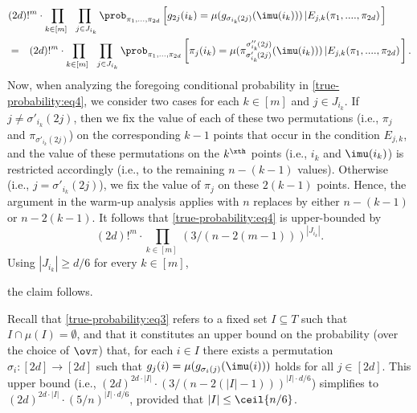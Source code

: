 %
%
%
\begin{eqnarray}
\lefteqn{(2d)!^{m}\cdot\prod_{k\in[m]~} \prod_{~j\in J_{i_k}}
     \prob_{\pi_1,\ldots,\pi_{2d}}
          \left[g_{2j}(i_k)=\mu(g_{\sigma_{i_k}\!(2j)}(\imu(i_k)))\left|
                E_{j,k}(\pi_1,....,\pi_{2d}) \right.\right]}
\nonumber \\
&=& (2d)!^{m}\cdot\prod_{k\in[m]~} \prod_{~j\in J_{i_k}}
     \prob_{\pi_1,\ldots,\pi_{2d}}
          \left[\pi_{j}(i_k)
      =\mu(\pi^{\sigma''_{i_k}\!(2j)}_{\sigma'_{i_k}\!(2j)}
	  (\imu(i_k)))\left|E_{j,k}(\pi_1,....,\pi_{2d}) \right.\right] .
\label{true-probability:eq4}
%
%
\end{eqnarray}
%
%
%
%
%
%
%
%
%
%
%
%
%
%
Now, when analyzing the foregoing conditional probability
in \eqref{true-probability:eq4},
we consider two cases for each $k\in[m]$ and $j\in J_{i_k}$.
If $j\neq\sigma'_{i_k}\!(2j)$, then
%
we fix the value of each of these two permutations
(i.e., $\pi_j$ and $\pi_{\sigma'_{i_k}\!(2j)}$)
on the corresponding $k-1$ points that occur in the condition $E_{j,k}$,
and the value of these permutations on the $k^\xth$ points
(i.e., $i_k$ and $\imu(i_k)$) is restricted accordingly
(i.e., to the remaining $n-(k-1)$ values).
%
Otherwise (i.e., $j=\sigma'_{i_k}\!(2j)$),
we fix the value of $\pi_j$ on these $2(k-1)$ points.
Hence, the argument in the warm-up analysis applies with $n$
replaces by either $n-(k-1)$ or $n-2(k-1)$.
It follows that \eqref{true-probability:eq4} is upper-bounded by
$$(2d)!^{m}\cdot\prod_{k\in[m]~}(3/(n-2(m-1)))^{|J_{i_k}|}.$$
Using $|J_{i_k}|\geq d/6$ for every $k\in[m]$,

the claim follows.
\Epf



\medskip

Recall that \eqref{true-probability:eq3} refers to
a fixed set $I\subseteq T$ such that $I\cap\mu(I)=\emptyset$,
and that it constitutes an upper bound
on the probability (over the choice of $\ov\pi$)
that, for each $i\in I$ there exists
a permutation $\sigma_i:[2d]\to[2d]$
such that $g_j(i)=\mu(g_{\sigma_i(j)}(\imu(i)))$
holds for all $j\in[2d]$.
This upper bound
(i.e., $(2d)^{2d\cdot|I|}\cdot(3/(n-2(|I|-1)))^{|I|\cdot d/6}$)
simplifies to $(2d)^{2d\cdot|I|}\cdot(5/n)^{|I|\cdot d/6}$,
provided that $|I|\leq\ceil{n/6}$.

%
%
%
%
%
%
%

